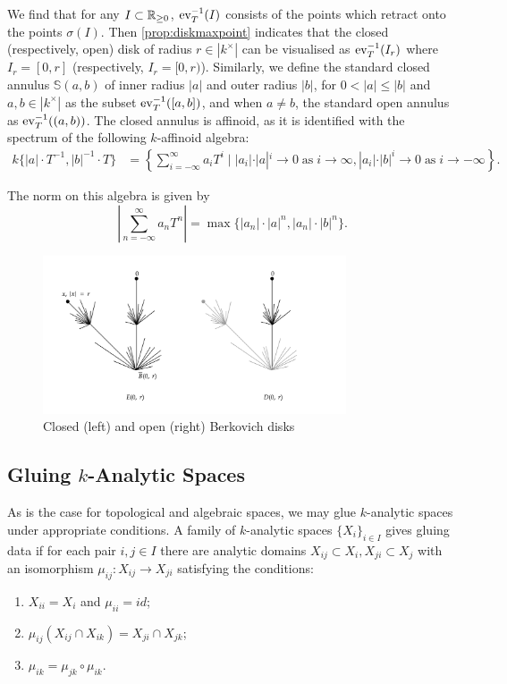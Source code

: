 We find that for any $I \subset \mathbb{R}_{\geq 0}$, $\operatorname{ev}_{T}^{-1}(I)$ consists of the points which retract onto the points $\sigma(I)$. Then \cref{prop:diskmaxpoint} indicates that the closed (respectively, open) disk of radius $r \in |k^\times|$ can be visualised as $\operatorname{ev}_{T}^{-1}(I_r)$ where $I_r = [0, r]$ (respectively, $I_r = [0, r)$). Similarly, \parencite[\S 2.1]{bpr} we define the standard closed annulus $\mathbb{S}(a, b)$ of inner radius $|a|$ and outer radius $|b|$, for $0 < |a| \leq |b|$ and $a, b \in |k^{\times}|$ as the subset $\operatorname{ev}_{T}^{-1}([a, b])$, and when $a \neq b$, the standard open annulus as $\operatorname{ev}_{T}^{-1}((a, b))$. 
The closed annulus is affinoid, as it is identified with the spectrum of the following $k$-affinoid algebra:
\begin{align*}
k\{|a| \cdot T^{-1}, |b|^{-1} \cdot T\} & = \left\{ \sum_{i = -\infty}^{\infty} a_i T^i \; | \; |a_i| \cdot |a|^i \to 0 \; \text{as} \; i \to \infty, |a_i| \cdot |b|^i \to 0 \; \text{as} \; i \to -\infty \right\}.
\end{align*}

The norm on this algebra is given by 
\[
    \left\vert \sum_{n = -\infty}^{\infty} a_n T^n \right\vert = \max \{ |a_n| \cdot |a|^n, |a_n| \cdot |b|^n \}.
\]


\begin{figure}[!ht]
    \centering
    \includegraphics[width=0.8\textwidth]{Images/disks.png}
    \caption{Closed (left) and open (right) Berkovich disks}
    \label{fig:disks}
\end{figure}

\subsection{Gluing $k$-Analytic Spaces}

As is the case for topological and algebraic spaces, we may glue $k$-analytic spaces under appropriate conditions. A family of $k$-analytic spaces $\{X_i\}_{i \in I}$ gives gluing data if for each pair $i, j \in I$ there are analytic domains $X_{ij} \subset X_i, X_{ji} \subset X_j$ with an isomorphism $\mu_{ij}: X_{ij} \to X_{ji}$ satisfying the conditions:
\begin{enumerate}
    \item $X_{ii} = X_i$ and $\mu_{ii} = id$;
    \item $\mu_{ij}(X_{ij} \cap X_{ik}) = X_{ji} \cap X_{jk}$;
    \item $\mu_{ik} = \mu_{jk} \circ \mu_{ik}$.
\end{enumerate}

